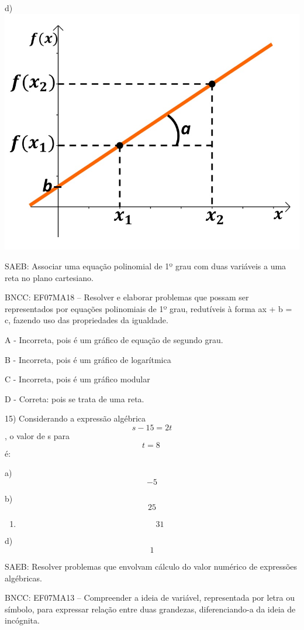 d) \includegraphics{./imgSAEB_7_MAT/media/image105.png}

SAEB: Associar uma equação polinomial de 1º grau com duas variáveis a
uma reta no plano cartesiano.

BNCC: EF07MA18 -- Resolver e elaborar problemas que possam ser
representados por equações polinomiais de 1º grau, redutíveis à forma ax
+ b = c, fazendo uso das propriedades da igualdade.

A - Incorreta, pois é um gráfico de equação de segundo grau.

B - Incorreta, pois é um gráfico de logarítmica

C - Incorreta, pois é um gráfico modular

D - Correta: pois se trata de uma reta.

15) Considerando a expressão algébrica \[s - 15 = 2t\], o valor de s
para \[t = 8\ \] é:

a) \[- 5\]

b) \[25\]

\begin{enumerate}
\def\labelenumi{\alph{enumi})}
\setcounter{enumi}{2}
\tightlist
\item
  \[\ 31\]
\end{enumerate}

d) \[1\]

SAEB: Resolver problemas que envolvam cálculo do valor numérico de
expressões algébricas.

BNCC: EF07MA13 -- Compreender a ideia de variável, representada por
letra ou símbolo, para expressar relação entre duas grandezas,
diferenciando-a da ideia de incógnita.

